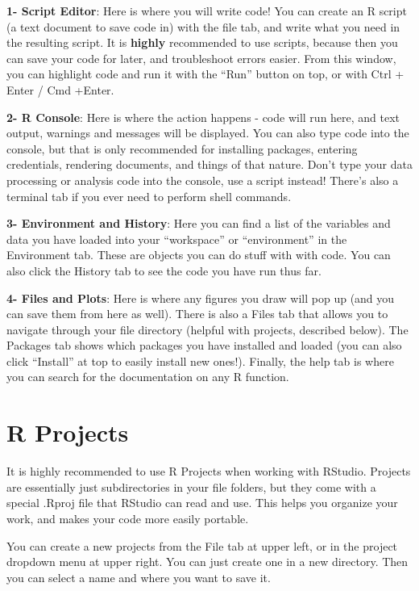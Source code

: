 \documentclass[
  letterpaper,
  DIV=11,
  numbers=noendperiod]{scrreprt}
\begin{document}
\textbf{1- Script Editor}: Here is where you will write code! You can
create an R script (a text document to save code in) with the file tab,
and write what you need in the resulting script. It is \textbf{highly}
recommended to use scripts, because then you can save your code for
later, and troubleshoot errors easier. From this window, you can
highlight code and run it with the ``Run'' button on top, or with Ctrl +
Enter / Cmd +Enter.

\textbf{2- R Console}: Here is where the action happens - code will run
here, and text output, warnings and messages will be displayed. You can
also type code into the console, but that is only recommended for
installing packages, entering credentials, rendering documents, and
things of that nature. Don't type your data processing or analysis code
into the console, use a script instead! There's also a terminal tab if
you ever need to perform shell commands.

\textbf{3- Environment and History}: Here you can find a list of the
variables and data you have loaded into your ``workspace'' or
``environment'' in the Environment tab. These are objects you can do
stuff with with code. You can also click the History tab to see the code
you have run thus far.

\textbf{4- Files and Plots}: Here is where any figures you draw will pop
up (and you can save them from here as well). There is also a Files tab
that allows you to navigate through your file directory (helpful with
projects, described below). The Packages tab shows which packages you
have installed and loaded (you can also click ``Install'' at top to
easily install new ones!). Finally, the help tab is where you can search
for the documentation on any R function.

\hypertarget{sec-rprojects}{%
\section{R Projects}\label{sec-rprojects}}

It is highly recommended to use R Projects when working with RStudio.
Projects are essentially just subdirectories in your file folders, but
they come with a special .Rproj file that RStudio can read and use. This
helps you organize your work, and makes your code more easily portable.

You can create a new projects from the File tab at upper left, or in the
project dropdown menu at upper right. You can just create one in a new
directory. Then you can select a name and where you want to save it.
\end{document}
